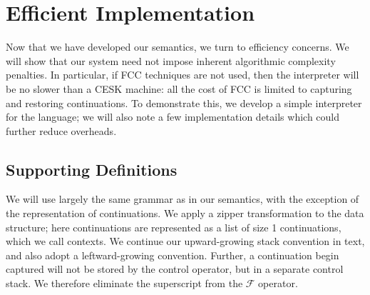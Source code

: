\documentclass[11pt]{article}
\newcommand{\maybePage}{\newpage}
\newcommand\F{\mathcal{F}}
\begin{document}




%

\maybePage
\section{Efficient Implementation}
\label{sec:efficientImpl}

Now that we have developed our semantics, we turn to efficiency concerns.
We will show that our system need not impose inherent algorithmic complexity penalties.
In particular, if FCC techniques are not used, then the interpreter will be no slower than a CESK machine: all the cost of FCC is limited to capturing and restoring continuations.
To demonstrate this, we develop a simple interpreter for the language; we will also note a few implementation details which could further reduce overheads.

\maybePage
\subsection{Supporting Definitions}

We will use largely the same grammar as in our semantics, with the exception of the representation of continuations.
We apply a zipper transformation to the data structure; here continuations are represented as a list of size 1 continuations, which we call contexts.
We continue our upward-growing stack convention in text, and also adopt a leftward-growing convention.
Further, a continuation begin captured will not be stored by the control operator, but in a separate control stack.
We therefore eliminate the superscript from the $\F$ operator.
\end{document}
